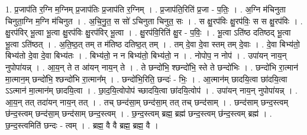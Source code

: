 \documentclass[17pt]{extarticle}
\begin{document}
1. प्र॒जाप॑ति र॒ग्नि म॒ग्निम् प्र॒जाप॑तिः प्र॒जाप॑ति र॒ग्निम् । . प्र॒जाप॑ति॒रिति॑ प्र॒जा - प॒तिः॒ । . अ॒ग्नि म॑चिनुता चिनुता॒ग्नि म॒ग्नि म॑चिनुत । . अ॒चि॒नु॒त॒ स सो॑ ऽचिनुता चिनुत॒ सः । . स क्षु॒रप॑विः क्षु॒रप॑विः॒ स स क्षु॒रप॑विः । . क्षु॒रप॑विर् भू॒त्वा भू॒त्वा क्षु॒रप॑विः क्षु॒रप॑विर् भू॒त्वा । . क्षु॒रप॑वि॒रिति॑ क्षु॒र - प॒विः॒ । . भू॒त्वा ऽति॑ष्ठ दतिष्ठद् भू॒त्वा भू॒त्वा ऽति॑ष्ठत् । . अ॒ति॒ष्ठ॒त् तम् त म॑तिष्ठ दतिष्ठ॒त् तम् । . तम् दे॒वा दे॒वा स्तम् तम् दे॒वाः । . दे॒वा बिभ्य॑तो॒ बिभ्य॑तो दे॒वा दे॒वा बिभ्य॑तः । . बिभ्य॑तो॒ न न बिभ्य॑तो॒ बिभ्य॑तो॒ न । . नोपोप॒ न नोप॑ । . उपा॑यन् नाय॒न् नुपोपा॑यन्न् । . आ॒य॒न् ते त आ॑यन् नाय॒न् ते । . ते छन्दो॑भि॒ श्छन्दो॑भि॒ स्ते ते छन्दो॑भिः । . छन्दो॑भि रा॒त्मान॑ मा॒त्मान॒म् छन्दो॑भि॒ श्छन्दो॑भि रा॒त्मान᳚म् । . छन्दो॑भि॒रिति॒ छन्दः॑ - भिः॒ । . आ॒त्मान॑म् छादयि॒त्वा छा॑दयि॒त्वा ऽऽत्मान॑ मा॒त्मान॑म् छादयि॒त्वा । . छा॒द॒यि॒त्वोपोप॑ च्छादयि॒त्वा छा॑दयि॒त्वोप॑ । . उपा॑यन् नाय॒न् नुपोपा॑यन्न् । . आ॒य॒न् तत् तदा॑यन् नाय॒न् तत् । . तच् छन्द॑सा॒म् छन्द॑सा॒म् तत् तच् छन्द॑साम् । . छन्द॑साम् छन्द॒स्त्वम् छ॑न्द॒स्त्वम् छन्द॑सा॒म् छन्द॑साम् छन्द॒स्त्वम् । . छ॒न्द॒स्त्वम् ब्रह्म॒ ब्रह्म॑ छन्द॒स्त्वम् छ॑न्द॒स्त्वम् ब्रह्म॑ । . छ॒न्द॒स्त्वमिति॑ छन्दः - त्वम् । . ब्रह्म॒ वै वै ब्रह्म॒ ब्रह्म॒ वै । \newline
\end{document}
